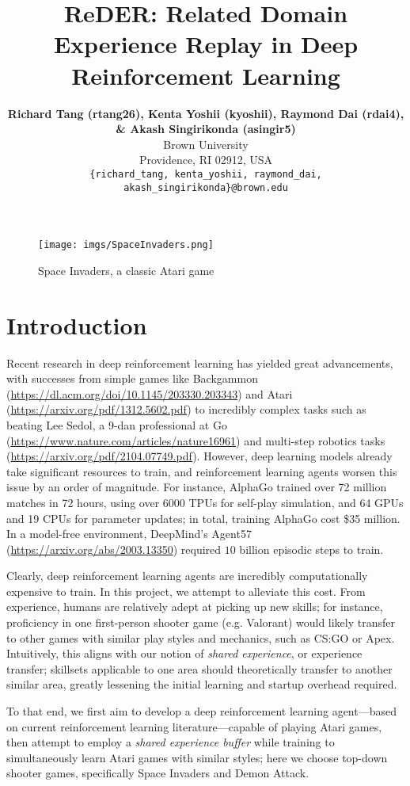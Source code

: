 \documentclass{article} %
\title{ReDER: Related Domain Experience Replay in Deep Reinforcement Learning}
\author{\textbf{Richard Tang (rtang26), Kenta Yoshii (kyoshii), Raymond Dai (rdai4),
    \& Akash Singirikonda (asingir5)} \\
Brown University\\
Providence, RI 02912, USA \\
\texttt{\{richard\_tang, kenta\_yoshii, raymond\_dai, akash\_singirikonda\}@brown.edu}
}
\begin{document}
\maketitle



\begin{figure}[htpb]
  \centering
  \texttt{[image: imgs/SpaceInvaders.png]}
  \caption{Space Invaders, a classic Atari game}
  \label{fig:imgs-SpaceInvaders-png}
\end{figure}

\section{Introduction}

Recent research in deep reinforcement learning has yielded great advancements, with successes from
simple games like Backgammon (\url{https://dl.acm.org/doi/10.1145/203330.203343}) and Atari
(\url{https://arxiv.org/pdf/1312.5602.pdf}) to incredibly complex tasks such as beating Lee Sedol, a
9-dan professional at Go (\url{https://www.nature.com/articles/nature16961}) and multi-step robotics
tasks (\url{https://arxiv.org/pdf/2104.07749.pdf}). However, deep learning models already take
significant resources to train, and reinforcement learning agents worsen this issue by an order of
magnitude. For instance, AlphaGo trained over 72 million matches in 72 hours, using over 6000 TPUs
for self-play simulation, and 64 GPUs and 19 CPUs for parameter updates; in total, training AlphaGo
cost \$35 million. In a model-free environment, DeepMind's Agent57
(\url{https://arxiv.org/abs/2003.13350}) required $10$ billion episodic steps to train.

Clearly, deep reinforcement learning agents are incredibly computationally expensive to train. In
this project, we attempt to alleviate this cost. From experience, humans are relatively adept at
picking up new skills; for instance, proficiency in one first-person shooter game (e.g. Valorant)
would likely transfer to other games with similar play styles and mechanics, such as CS:GO or Apex.
Intuitively, this aligns with our notion of \textit{shared experience}, or experience transfer;
skillsets applicable to one area should theoretically transfer to another similar area, greatly
lessening the initial learning and startup overhead required.

To that end, we first aim to develop a deep reinforcement learning agent---based on current
reinforcement learning literature---capable of playing Atari games, then attempt to employ a
\textit{shared experience buffer} while training to simultaneously learn Atari games with similar
styles; here we choose top-down shooter games, specifically Space Invaders and Demon Attack.
\end{document}
